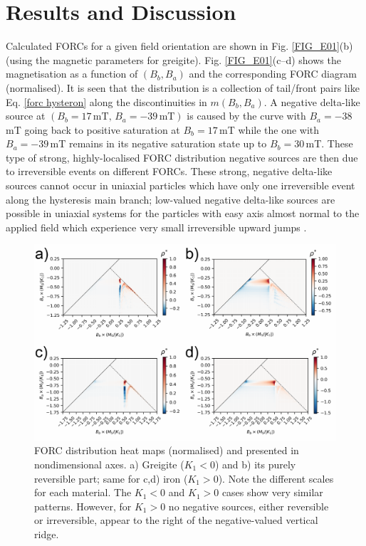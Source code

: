 \section{Results and Discussion}
Calculated FORCs for a given field orientation are shown in Fig. \ref{FIG_E01}(b) (using the magnetic parameters for greigite). Fig. \ref{FIG_E01}(c--d) shows the magnetisation as a function of $(B_b, B_a)$ and the corresponding FORC diagram (normalised). It is seen that the distribution is a collection of tail/front pairs like Eq. \ref{forc hysteron} along the discontinuities in $m(B_b, B_a)$. A negative delta-like source at $(B_b=17\,\mathrm{mT},\,B_a=-39\,\mathrm{mT})$ is caused by the curve with $B_a=-38\,$mT going back to positive saturation at $B_b=17\,$mT while the one with $B_a=-39\,$mT remains in its negative saturation state up to $B_b=30\,$mT. These type of strong, highly-localised FORC distribution negative sources are then due to irreversible events on different FORCs. These strong, negative delta-like sources cannot occur in uniaxial particles which have only one irreversible event along the hysteresis main branch; low-valued negative delta-like sources are possible in uniaxial systems for the particles with easy axis almost normal to the applied field which experience very small irreversible upward jumps \citep{Stoner1948,Newell2005}.
\begin{figure}
\includegraphics[width=\textwidth]{research-2/figs/rePLOT_FIG03.pdf}
\caption[FORC distribution heat maps (dipolar model)]{FORC distribution heat maps (normalised) and presented in nondimensional axes. a) Greigite ($K_1 < 0$) and b) its purely reversible part; same for c,d) iron ($K_1 > 0$). Note the different scales for each material. The $K_1 < 0$ and $K_1>0$ cases show very similar patterns. However, for $K_1 > 0$ no negative sources, either reversible or irreversible, appear to the right of the negative-valued vertical ridge.}
\label{FIG_E03}
\end{figure}
\par

